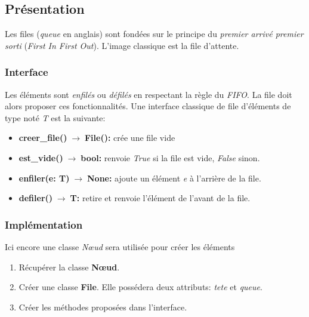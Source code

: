 \documentclass[a4paper,11pt]{article}
\begin{document}
\begin{Form}
\subsection{Présentation}
Les files (\emph{queue} en anglais) sont fondées sur le principe du \emph{premier arrivé premier sorti} (\emph{First In First Out}). L'image classique est la file d'attente.
\begin{figure}[!h]
\centering
{}
\end{figure}
\subsubsection{Interface}
Les éléments sont \emph{enfilés} ou \emph{défilés} en respectant la règle du \emph{FIFO}. La file doit alors proposer ces fonctionnalités. Une interface classique de file  d'éléments de type noté \emph{T} est la suivante:
\begin{itemize}
\item \textbf{creer\_file()$\;\rightarrow\;$File():} crée une file vide
\item \textbf{est\_vide()$\;\rightarrow\;$bool:} renvoie \emph{True} si la file est vide, \emph{False} sinon.
\item \textbf{enfiler(e: T)$\;\rightarrow\;$None:} ajoute un élément \emph{e} à l'arrière de la file.
\item \textbf{defiler()$\;\rightarrow\;$T:} retire et renvoie l'élément de l'avant de la file.
\end{itemize}
\subsubsection{Implémentation}
Ici encore une classe \emph{Nœud} sera utilisée pour créer les éléments
\begin{activite}
\begin{enumerate}
\item Récupérer la classe \textbf{Nœud}. 
\item Créer une classe \textbf{File}. Elle possédera deux attributs: \emph{tete} et \emph{queue}.
\item Créer les méthodes proposées dans l'interface.
\end{enumerate}
\end{activite}

\end{Form}
\end{document}

